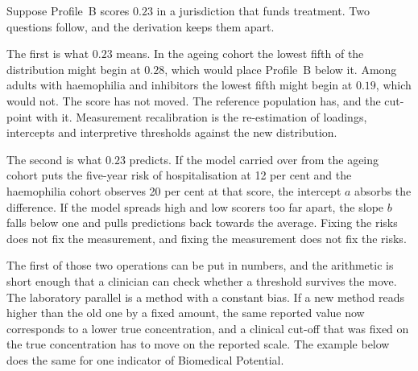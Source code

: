 \begin{reading}
Suppose Profile~B scores $0.23$ in a jurisdiction that funds treatment. Two
questions follow, and the derivation keeps them apart.

The first is what $0.23$ means. In the ageing cohort the lowest fifth of the
distribution might begin at $0.28$, which would place Profile~B below it. Among
adults with haemophilia and inhibitors the lowest fifth might begin at $0.19$,
which would not. The score has not moved. The reference population has, and the
cut-point with it. Measurement recalibration is the re-estimation of loadings,
intercepts and interpretive thresholds against the new distribution.

The second is what $0.23$ predicts. If the model carried over from the ageing
cohort puts the five-year risk of hospitalisation at 12 per cent and the
haemophilia cohort observes 20 per cent at that score, the intercept $a$
absorbs the difference. If the model spreads high and low scorers too far
apart, the slope $b$ falls below one and pulls predictions back towards the
average. Fixing the risks does not fix the measurement, and fixing the
measurement does not fix the risks.
\end{reading}

The first of those two operations can be put in numbers, and the arithmetic is
short enough that a clinician can check whether a threshold survives the move.
The laboratory parallel is a method with a constant bias. If a new method reads
higher than the old one by a fixed amount, the same reported value now
corresponds to a lower true concentration, and a clinical cut-off that was
fixed on the true concentration has to move on the reported scale. The example
below does the same for one indicator of Biomedical Potential.

